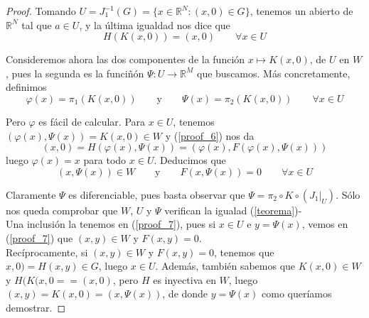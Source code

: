 \documentclass[a4paper, 12pt]{article}
\begin{document}
\begin{enumerate}[label=\textbf{\arabic*}.]
\begin{proof}
Tomando \(U = J_1^{-1} (G) = \{ x \in \mathbb{R}^N : (x,0) \in G\}\), tenemos un abierto de \(\mathbb{R}^N\) tal que \(a \in U\), y la última igualdad nos dice que
\begin{equation}\label{proof_6}
H(K(x,0)) = (x,0) \qquad \forall x \in U
\end{equation}

Consideremos ahora las dos componentes de la función \(x \mapsto K(x,0)\), de \(U\) en \(W\), pues la segunda es la funciñón \(\Psi : U \to \mathbb{R}^M\) que buscamos. Más concretamente, definimos
\[
	\varphi (x) = \pi_1 (K(x,0)) \qquad \text{y} \qquad \Psi (x) = \pi_2 (K(x,0)) \qquad \forall x \in U
\]

Pero \(\varphi\) es fácil de calcular. Para \(x \in U\), tenemos \((\varphi (x), \Psi (x)) = K(x,0) \in W\) y (\ref{proof_6}) nos da
\[
	(x,0) = H(\varphi (x), \Psi (x)) = (\varphi (x), F(\varphi(x), \Psi (x)))
\]
luego \(\varphi (x) = x\) para todo \(x \in U\). Deducimos que
\begin{equation}\label{proof_7}
	(x, \Psi (x)) \in W \qquad \text{y} \qquad F(x, \Psi (x)) = 0 \qquad \forall x \in U
\end{equation}

Claramente \(\Psi\) es diferenciable, pues basta observar que \(\Psi = \pi_2 \circ K \circ (J_1 |_U)\). Sólo nos queda comprobar que \(W\), \(U\) y \(\Psi\) verifican la igualad (\ref{teorema})- \\

Una inclusión la tenemos en (\ref{proof_7}), pues si \(x \in U\) e \(y = \Psi (x)\), vemos en (\ref{proof_7}) que \((x,y) \in W\) y \(F (x,y) = 0\). \\

Recíprocamente, si \((x,y) \in W\) y \(F(x,y) = 0\), tenemos que \(x,0) = H(x,y) \in G\), luego \(x \in U\). Además, también sabemos que \(K(x,0) \in W\) y \(H(K(x,0= = (x,0)\), pero \(H\) es inyectiva en \(W\), luego \((x,y) = K(x,0) = (x, \Psi (x))\), de donde \(y = \Psi (x)\) como queríamos demostrar.
\end{proof}
\end{enumerate}
\end{document}
